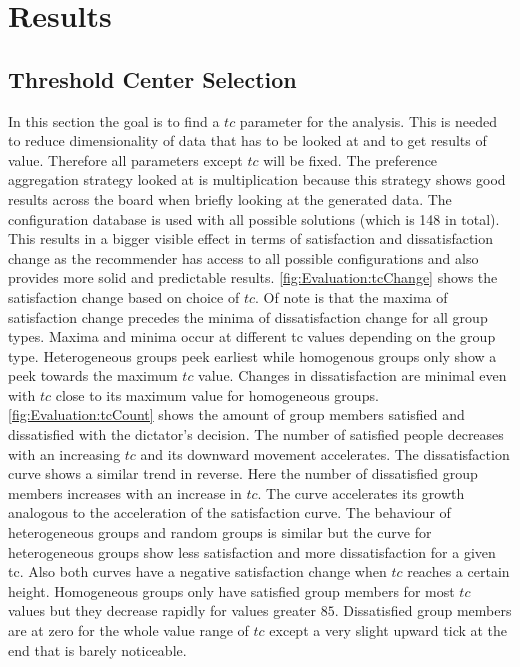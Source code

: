 \section{Results}
\label{sec:Evaluation:Findings}

\subsection{Threshold Center Selection}

In this section the goal is to find a $tc$ parameter for the analysis. This is needed to reduce dimensionality of data that has to be looked at and to get results of value. Therefore all parameters except $tc$ will be fixed. The preference aggregation strategy looked at is multiplication because this strategy shows good results across the board when briefly looking at the generated data. The configuration database is used with all possible solutions (which is 148 in total). This results in a bigger visible effect in terms of satisfaction and dissatisfaction change as the recommender has access to all possible configurations and also provides more solid and predictable results. \autoref{fig:Evaluation:tcChange} shows the satisfaction change based on choice of $tc$. Of note is that the maxima of satisfaction change precedes the minima of dissatisfaction change for all group types. Maxima and minima occur at different tc values depending on the group type. Heterogeneous groups peek earliest while homogenous groups only show a peek towards the maximum $tc$ value. Changes in dissatisfaction are minimal even with $tc$ close to its maximum value for homogeneous groups. \autoref{fig:Evaluation:tcCount} shows the amount of group members satisfied and dissatisfied with the dictator's decision. The number of satisfied people decreases with an increasing $tc$ and its downward movement accelerates. The dissatisfaction curve shows a similar trend in reverse. Here the number of dissatisfied group members increases with an increase in $tc$. The curve accelerates its growth analogous to the acceleration of the satisfaction curve. The behaviour of heterogeneous groups and random groups is similar but the curve for heterogeneous groups show less satisfaction and more dissatisfaction for a given tc. Also both curves have a negative satisfaction change when $tc$ reaches a certain height. Homogeneous groups only have satisfied group members for most $tc$ values but they decrease rapidly for values greater $85$. Dissatisfied group members are at zero for the whole value range of $tc$ except a very slight upward tick at the end that is barely noticeable.

